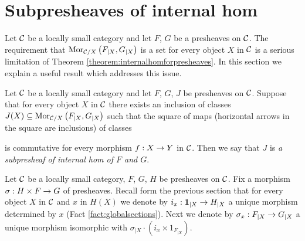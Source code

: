\section{Subpresheaves of internal hom}
\noindent
Let ${\mathcal C}$ be a locally small category and let $F$, $G$ be a presheaves on ${\mathcal C}$. The requirement that $\mathrm{Mor}_{{\mathcal C}/X}\left(F_{\mid X},G_{\mid X}\right)$ is a set for every object $X$ in ${\mathcal C}$ is a serious limitation of Theorem \ref{theorem:internalhomforpresheaves}. In this section we explain a useful result which addresses this issue.

\begin{definition}
Let ${\mathcal C}$ be a locally small category and let $F$, $G$, $J$ be presheaves on ${\mathcal C}$. Suppose that for every object $X$ in ${\mathcal C}$ there exists an inclusion of classes $J(X)\subseteq \mathrm{Mor}_{{\mathcal C}/X}\left(F_{\mid X},G_{\mid X}\right)$ such that the square of maps (horizontal arrows in the square are inclusions) of classes
\begin{center}
\end{center}
is commutative for every morphism $f:X\rightarrow Y$ in ${\mathcal C}$. Then we say that $J$ is \textit{a subpresheaf of internal hom of $F$ and $G$}.
\end{definition}
\noindent
Let ${\mathcal C}$ be a locally small category, $F$, $G$, $H$ be presheaves on ${\mathcal C}$. Fix a morphism $\sigma:H\times F\rightarrow G$ of presheaves. Recall form the previous section that for every object $X$ in ${\mathcal C}$ and $x$ in $H(X)$ we denote by $i_x:\mathbf{1}_{\mid X}\rightarrow H_{\mid X}$ a unique morphism determined by $x$ (Fact \ref{fact:globalsections}). Next we denote by $\sigma_x:F_{\mid X}\rightarrow G_{\mid X}$ a unique morphism isomorphic with $\sigma_{\mid X}\cdot \left(i_x\times 1_{F_{\mid X}}\right)$. 

